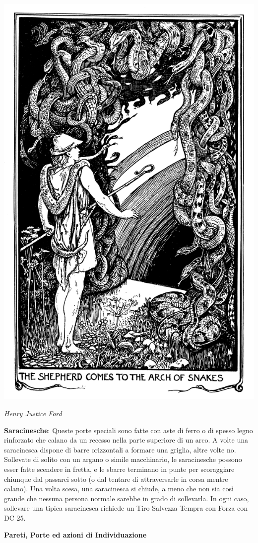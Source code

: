 \begin{multicols}{2}
\begin{center}
	\includegraphics[width=0.8\linewidth]{immagini/arcoserpenti.png}

	\emph{Henry Justice Ford}
\end{center}

\textbf{Saracinesche}: Queste porte speciali sono fatte con aste di ferro o di spesso legno rinforzato che calano da un recesso nella parte superiore di un arco. A volte una saracinesca dispone di barre orizzontali a formare una griglia, altre volte no. Sollevate di solito con un argano o simile macchinario, le saracinesche possono esser fatte scendere in fretta, e le sbarre terminano in punte per scoraggiare chiunque dal passarci sotto (o dal tentare di attraversarle in corsa mentre calano). Una volta scesa, una saracinesca si chiude, a meno che non sia così grande che nessuna persona normale sarebbe in grado di sollevarla. In ogni caso, sollevare una tipica saracinesca richiede un Tiro Salvezza Tempra con Forza con DC 25.

\textbf{Pareti, Porte ed azioni di Individuazione}


\end{multicols}
